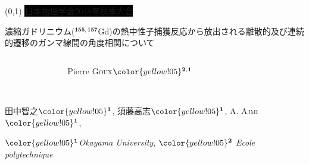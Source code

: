 

\begin{frame}[plain]{}
\centering
\vspace{\baselineskip}
\begin{center}
\boxput*(0,1){
    \colorbox{black}{\textcolor{yellow!05}{日本物理学会2018年秋季大会
}}
}{    
\setlength{\fboxsep}{5pt}
}\\
\vspace{.7\baselineskip}
\begin{minipage}{.85\linewidth}\centering\large \color{yellow!05} 濃縮ガドリニウム($^{\mathbf{155,157}}$Gd)の熱中性子捕獲反応から放出される離散的及び連続的遷移のガンマ線間の角度相関について\\\end{minipage}
\end{center}
\vspace{\baselineskip}
\begin{columns}
\begin{column}[T]{.3\linewidth}
\centering
\end{column}
\begin{column}[T]{.4\linewidth}\vspace{-\baselineskip}
\begin{center}\large{Pierre \textsc{Goux}}$\color{yellow!05}\mathbf{^{2,1}}$\\ \vspace{.5em}{平成30年9月14日} \\
\end{center}
\end{column}        
\begin{column}[T]{.3\linewidth}
\end{column}
\end{columns}\vspace{\baselineskip}
\begin{minipage}{.92\linewidth}
田中智之$\color{yellow!05}\mathbf{^1}$, 須藤高志$\color{yellow!05}\mathbf{^1}$, A. \textsc{Ajmi}$\color{yellow!05}\mathbf{^1}$, 
\end{minipage}
\vspace{.6em}

\footnotesize{\textit{$\color{yellow!05}\mathbf{^1}$Okayama University, $\color{yellow!05}\mathbf{^2}$ Ecole polytechnique} 
}
\vspace{\baselineskip}
\end{frame}

